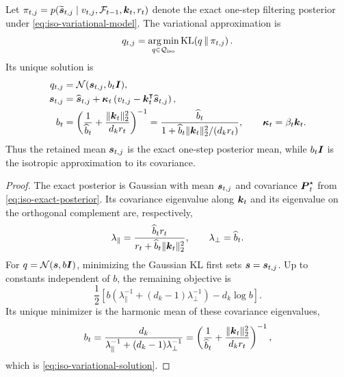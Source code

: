 \documentclass[11pt,letterpaper,logo]{yalearxiv}
\begin{document}
\begin{proposition}
\label{prop:iso-variational-inference}
Let
$\pi_{t,j}=p(\widetilde{\boldsymbol{s}}_{t,j}\mid
v_{t,j},\mathcal{F}_{t-1},\boldsymbol{k}_t,r_t)$ denote the exact one-step filtering posterior under
\eqref{eq:iso-variational-model}. The variational approximation is
\begin{equation}
  q_{t,j}
  =\operatorname*{arg\,min}_{q\in\mathcal{Q}_{\mathrm{iso}}}
    \operatorname{KL}\!\left(q\,\|\,\pi_{t,j}\right).
  \label{eq:iso-variational-objective}
\end{equation}
Its unique solution is
\begin{equation}
\begin{aligned}
  q_{t,j}
  &=\mathcal N(\boldsymbol{s}_{t,j},b_t\boldsymbol{I}),
  \\
  \boldsymbol{s}_{t,j}
  &=\widehat{\boldsymbol{s}}_{t,j}
    +\boldsymbol{\kappa}_t
      \left(v_{t,j}-\boldsymbol{k}_t^{\intercal}\widehat{\boldsymbol{s}}_{t,j}\right),
  \\
  b_t
  &=\left(
      \frac{1}{\widehat b_t}
      +\frac{\|\boldsymbol{k}_t\|_2^2}{d_k r_t}
    \right)^{-1}
   =\frac{\widehat b_t}
    {1+\widehat b_t\|\boldsymbol{k}_t\|_2^2/(d_k r_t)},
  \qquad
  \boldsymbol{\kappa}_t=\beta_t\boldsymbol{k}_t.
\end{aligned}
  \label{eq:iso-variational-solution}
\end{equation}
Thus the retained mean $\boldsymbol{s}_{t,j}$ is the exact one-step posterior mean, while $b_t\boldsymbol{I}$ is
the isotropic approximation to its covariance.
\end{proposition}

\begin{proof}
The exact posterior is Gaussian with mean $\boldsymbol{s}_{t,j}$ and covariance $\boldsymbol{P}_t^\star$ from
\eqref{eq:iso-exact-posterior}. Its covariance eigenvalue along $\boldsymbol{k}_t$ and its eigenvalue on
the orthogonal complement are, respectively,
\begin{equation}
  \lambda_{\parallel}
  =\frac{\widehat b_t r_t}
    {r_t+\widehat b_t\|\boldsymbol{k}_t\|_2^2},
  \qquad
  \lambda_{\perp}=\widehat b_t.
  \label{eq:iso-posterior-eigenvalues}
\end{equation}
For $q=\mathcal N(\boldsymbol{s},b\boldsymbol{I})$, minimizing the Gaussian KL first sets
$\boldsymbol{s}=\boldsymbol{s}_{t,j}$. Up to constants independent of $b$, the remaining objective is
\begin{equation}
  \frac{1}{2}
  \left[
    b\left(\lambda_{\parallel}^{-1}
      +(d_k-1)\lambda_{\perp}^{-1}\right)
    -d_k\log b
  \right].
  \label{eq:iso-variational-covariance-objective}
\end{equation}
Its unique minimizer is the harmonic mean of these covariance eigenvalues,
\begin{equation}
  b_t
  =\frac{d_k}
    {\lambda_{\parallel}^{-1}+(d_k-1)\lambda_{\perp}^{-1}}
  =\left(
      \frac{1}{\widehat b_t}
      +\frac{\|\boldsymbol{k}_t\|_2^2}{d_k r_t}
    \right)^{-1},
\end{equation}
which is \eqref{eq:iso-variational-solution}.
\end{proof}
\end{document}
